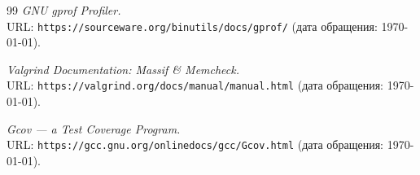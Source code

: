 \begin{thebibliography}{99}
{\itshape GNU gprof Profiler.} \\URL: \texttt{https://sourceware.org/binutils/docs/gprof/} (дата обращения: \today).

{\itshape Valgrind Documentation: Massif \& Memcheck.} \\URL: \texttt{https://valgrind.org/docs/manual/manual.html} (дата обращения: \today).

{\itshape Gcov — a Test Coverage Program.} \\URL: \texttt{https://gcc.gnu.org/onlinedocs/gcc/Gcov.html} (дата обращения: \today).
\end{thebibliography}
\pagebreak